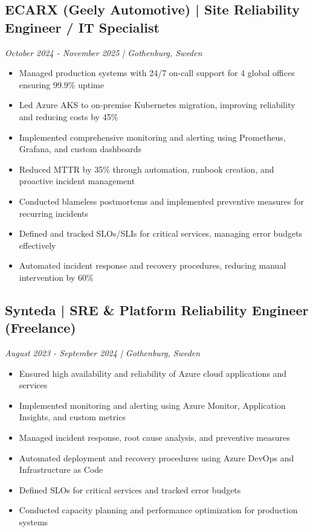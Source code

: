 \documentclass[11pt,a4paper]{article}
\begin{document}
\subsection*{ECARX (Geely Automotive) | Site Reliability Engineer / IT Specialist}
\textit{October 2024 - November 2025 | Gothenburg, Sweden}
\begin{itemize}[noitemsep]
\item Managed production systems with 24/7 on-call support for 4 global offices ensuring 99.9\% uptime
\item Led Azure AKS to on-premise Kubernetes migration, improving reliability and reducing costs by 45\%
\item Implemented comprehensive monitoring and alerting using Prometheus, Grafana, and custom dashboards
\item Reduced MTTR by 35\% through automation, runbook creation, and proactive incident management
\item Conducted blameless postmortems and implemented preventive measures for recurring incidents
\item Defined and tracked SLOs/SLIs for critical services, managing error budgets effectively
\item Automated incident response and recovery procedures, reducing manual intervention by 60\%
\end{itemize}

\subsection*{Synteda | SRE \& Platform Reliability Engineer (Freelance)}
\textit{August 2023 - September 2024 | Gothenburg, Sweden}
\begin{itemize}[noitemsep]
\item Ensured high availability and reliability of Azure cloud applications and services
\item Implemented monitoring and alerting using Azure Monitor, Application Insights, and custom metrics
\item Managed incident response, root cause analysis, and preventive measures
\item Automated deployment and recovery procedures using Azure DevOps and Infrastructure as Code
\item Defined SLOs for critical services and tracked error budgets
\item Conducted capacity planning and performance optimization for production systems
\end{itemize}
\end{document}
